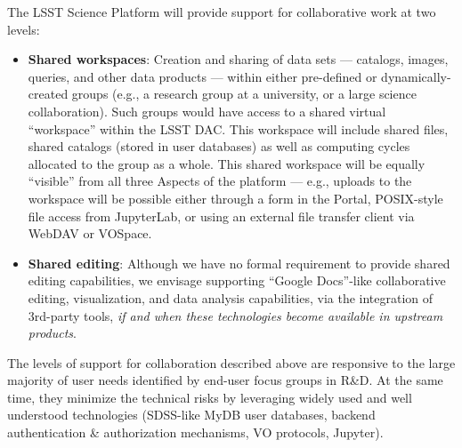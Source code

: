 The LSST Science Platform will provide support for collaborative work at two levels:
\begin{itemize}
	\item \textbf{Shared workspaces}: Creation and sharing of data sets --- catalogs, images, queries, and other data products --- within either pre-defined or dynamically-created groups (e.g., a research group at a university, or a large science collaboration).
Such groups would have access to a shared virtual ``workspace'' within the LSST DAC.
This workspace will include shared files, shared catalogs (stored in user databases) as well as computing cycles allocated to the group as a whole.
This shared workspace will be equally ``visible'' from all three Aspects of the platform --- e.g., uploads to the workspace will be possible either through a form in the Portal, POSIX-style file access from JupyterLab, or using an external file transfer client via WebDAV or VOSpace.

	\item \textbf{Shared editing}: Although we have no formal requirement to provide shared editing capabilities, we envisage supporting ``Google Docs''-like collaborative editing, visualization, and data analysis capabilities, via the integration of 3rd-party tools, \emph{if and when these technologies become available in upstream products}.
\end{itemize}

The levels of support for collaboration described above are responsive to the large majority of user needs identified by end-user focus groups in R\&D. At the same time, they minimize the technical risks by leveraging widely used and well understood technologies (SDSS-like MyDB user databases, backend authentication \& authorization mechanisms, VO protocols, Jupyter).
